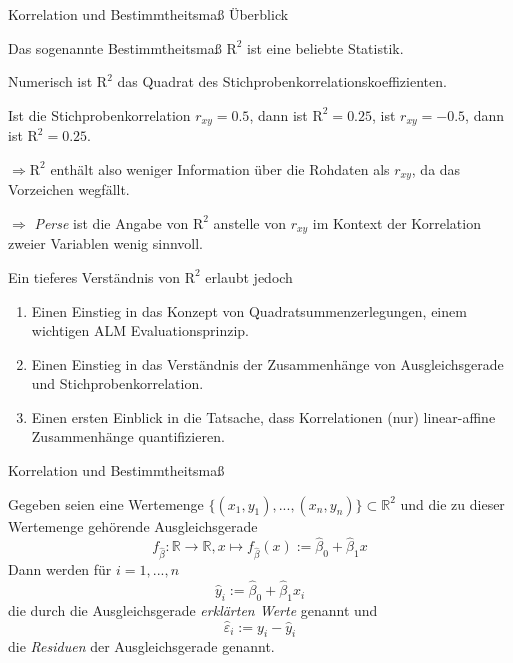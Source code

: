 \documentclass[
  8pt,
  ignorenonframetext,
]{beamer}
\providecommand{\tightlist}{%
  \setlength{\itemsep}{0pt}\setlength{\parskip}{0pt}}
\begin{document}
\begin{frame}{Korrelation und Bestimmtheitsmaß}
\protect\hypertarget{korrelation-und-bestimmtheitsmauxdf}{}
Überblick  \footnotesize

Das sogenannte Bestimmtheitsmaß \(\mbox{R}^2\) ist eine beliebte
Statistik.

Numerisch ist \(\mbox{R}^2\) das Quadrat des
Stichprobenkorrelationskoeffizienten.

Ist die Stichprobenkorrelation \(r_{xy} = 0.5\), dann ist
\(\mbox{R}^2 = 0.25\), ist \(r_{xy} = -0.5\), dann ist
\(\mbox{R}^2 = 0.25\).

\(\Rightarrow \mbox{R}^2\) enthält also weniger Information über die
Rohdaten als \(r_{xy}\), da das Vorzeichen wegfällt.

\(\Rightarrow\) \textit{Perse} ist die Angabe von \(\mbox{R}^2\)
anstelle von \(r_{xy}\) im Kontext der Korrelation zweier Variablen
wenig sinnvoll.

Ein tieferes Verständnis von \(\mbox{R}^2\) erlaubt jedoch

\begin{enumerate}
[(1)]
\tightlist
\item
  Einen Einstieg in das Konzept von Quadratsummenzerlegungen, einem
  wichtigen ALM Evaluationsprinzip.
\item
  Einen Einstieg in das Verständnis der Zusammenhänge von
  Ausgleichsgerade und Stichprobenkorrelation.
\item
  Einen ersten Einblick in die Tatsache, dass Korrelationen (nur)
  linear-affine Zusammenhänge quantifizieren.
\end{enumerate}
\end{frame}

\begin{frame}{Korrelation und Bestimmtheitsmaß}
\protect\hypertarget{korrelation-und-bestimmtheitsmauxdf-1}{}
\small
\begin{definition}
\justifying
Gegeben seien eine Wertemenge $\{(x_1,y_1), ..., (x_n,y_n)\} \subset \mathbb{R}^2$
und die zu dieser Wertemenge gehörende Ausgleichsgerade
\begin{equation}
f_{\hat{\beta}} : \mathbb{R} \to \mathbb{R}, x \mapsto f_{\hat{\beta}}(x) := \hat{\beta}_0 + \hat{\beta}_1x
\end{equation}
Dann werden für $i = 1,...,n$
\begin{equation}
\hat{y}_i := \hat{\beta}_0 + \hat{\beta}_1x_i
\end{equation}
die durch die Ausgleichsgerade \textit{erklärten Werte} genannt und
\begin{equation}
\hat{\varepsilon}_i := y_i - \hat{y}_i
\end{equation}
die \textit{Residuen} der Ausgleichsgerade genannt.
\end{definition}
\end{frame}
\end{document}
